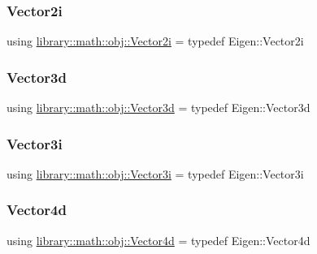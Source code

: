 \subsubsection{\texorpdfstring{Vector2i}{Vector2i}}
{\footnotesize\ttfamily using \hyperlink{namespacelibrary_1_1math_1_1obj_a27d8117bb406c37fd0aee60b61f0bcb9}{library\+::math\+::obj\+::\+Vector2i} = typedef Eigen\+::\+Vector2i}

\mbox{\label{namespacelibrary_1_1math_1_1obj_a977e84e9bf317a4e7dd9d6d671d6da2f}} 
\subsubsection{\texorpdfstring{Vector3d}{Vector3d}}
{\footnotesize\ttfamily using \hyperlink{namespacelibrary_1_1math_1_1obj_a977e84e9bf317a4e7dd9d6d671d6da2f}{library\+::math\+::obj\+::\+Vector3d} = typedef Eigen\+::\+Vector3d}

\mbox{\label{namespacelibrary_1_1math_1_1obj_a9d2ecef9029409b29e79b366e0b9941f}} 
\subsubsection{\texorpdfstring{Vector3i}{Vector3i}}
{\footnotesize\ttfamily using \hyperlink{namespacelibrary_1_1math_1_1obj_a9d2ecef9029409b29e79b366e0b9941f}{library\+::math\+::obj\+::\+Vector3i} = typedef Eigen\+::\+Vector3i}

\mbox{\label{namespacelibrary_1_1math_1_1obj_a5679bbebea773cc0d4ed6ec28eb79c03}} 
\subsubsection{\texorpdfstring{Vector4d}{Vector4d}}
{\footnotesize\ttfamily using \hyperlink{namespacelibrary_1_1math_1_1obj_a5679bbebea773cc0d4ed6ec28eb79c03}{library\+::math\+::obj\+::\+Vector4d} = typedef Eigen\+::\+Vector4d}

